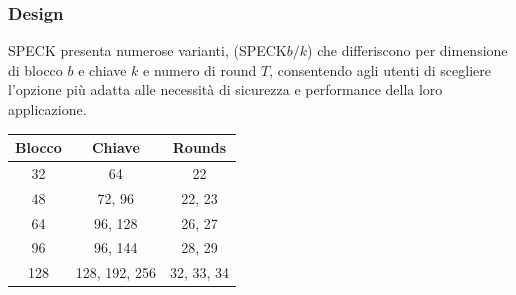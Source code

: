 \documentclass[target=bach,aauheader=,style=]{thud}
\begin{document}
			\subsubsection{Design}
			SPECK presenta numerose varianti, (SPECK$b/k$) che differiscono per dimensione di blocco $b$ e chiave $k$ e numero di round $T$, consentendo agli utenti di scegliere l'opzione più adatta alle necessità di sicurezza e performance della loro applicazione.\\
			\begin{center}
				\begin{tabular}{ |c|c|c| } 
					\hline
					\textbf{Blocco} & \textbf{Chiave} & \textbf{Rounds} \\ 
					\hline 
					\hline
					32 & 64 & 22\\
					\hline
					48 & 72, 96 & 22, 23\\
					\hline
					64 & 96, 128 & 26, 27\\
					\hline
					96 & 96, 144 & 28, 29\\
					\hline
					128 & 128, 192, 256 & 32, 33, 34\\
					\hline
				\end{tabular}
			\end{center}
			
\end{document}
